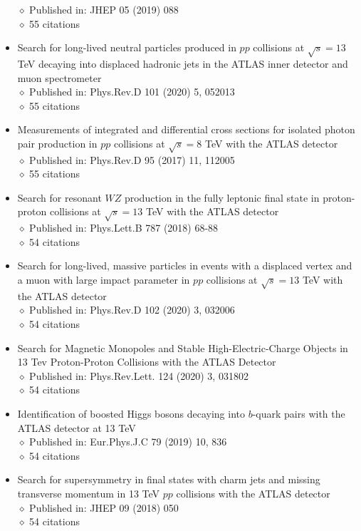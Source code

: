 \documentclass[margin, 10pt]{res} %
\begin{document}
\begin{resume}
\begin{itemize}
$\diamond$ Published in: JHEP 05 (2019) 088\\
$\diamond$ 55 citations
\item Search for long-lived neutral particles produced in $pp$ collisions at $\sqrt{s} = 13$ TeV decaying into displaced hadronic jets in the ATLAS inner detector and muon spectrometer\\
$\diamond$ Published in: Phys.Rev.D 101 (2020) 5, 052013\\
$\diamond$ 55 citations
\item Measurements of integrated and differential cross sections for isolated photon pair production in $pp$ collisions at $\sqrt{s} = 8$ TeV with the ATLAS detector\\
$\diamond$ Published in: Phys.Rev.D 95 (2017) 11, 112005\\
$\diamond$ 55 citations
\item Search for resonant $WZ$ production in the fully leptonic final state in proton-proton collisions at $\sqrt{s} = 13$ TeV with the ATLAS detector\\
$\diamond$ Published in: Phys.Lett.B 787 (2018) 68-88\\
$\diamond$ 54 citations
\item Search for long-lived, massive particles in events with a displaced vertex and a muon with large impact parameter in $pp$ collisions at $\sqrt{s} = 13$ TeV with the ATLAS detector\\
$\diamond$ Published in: Phys.Rev.D 102 (2020) 3, 032006\\
$\diamond$ 54 citations
\item Search for Magnetic Monopoles and Stable High-Electric-Charge Objects in 13 Tev Proton-Proton Collisions with the ATLAS Detector\\
$\diamond$ Published in: Phys.Rev.Lett. 124 (2020) 3, 031802\\
$\diamond$ 54 citations
\item Identification of boosted Higgs bosons decaying into $b$-quark pairs with the ATLAS detector at 13 TeV\\
$\diamond$ Published in: Eur.Phys.J.C 79 (2019) 10, 836\\
$\diamond$ 54 citations
\item Search for supersymmetry in final states with charm jets and missing transverse momentum in 13 TeV $pp$ collisions with the ATLAS detector\\
$\diamond$ Published in: JHEP 09 (2018) 050\\
$\diamond$ 54 citations

\end{itemize}
\end{resume}
\end{document}

